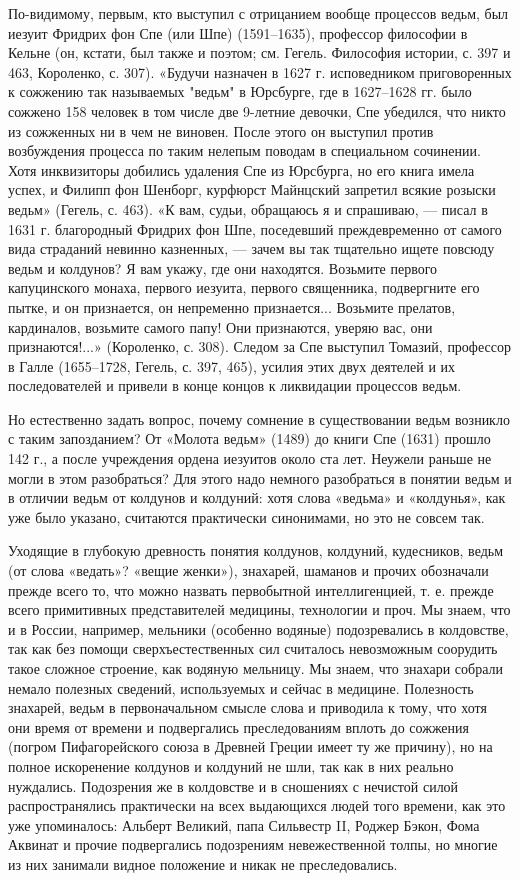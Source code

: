 По-видимому, первым, кто выступил с отрицанием вообще процессов ведьм, был
иезуит Фридрих фон Спе (или Шпе) (1591--1635), профессор философии в Кельне (он,
кстати, был также и поэтом; см. Гегель.
Философия истории, с. 397 и 463, Короленко, с. 307). «Будучи назначен в 1627 г.
исповедником приговоренных к сожжению так называемых "ведьм" в Юрсбурге, где в
1627--1628 гг. было сожжено 158 человек в том числе две 9-летние девочки, Спе
убедился, что никто из сожженных ни в чем не виновен. После этого он выступил
против возбуждения процесса по таким нелепым поводам в специальном сочинении.
Хотя инквизиторы добились удаления Спе из Юрсбурга, но его книга имела успех, и
Филипп фон Шенборг, курфюрст Майнцский запретил всякие розыски ведьм» (Гегель,
с. 463). «К вам, судьи, обращаюсь я и спрашиваю, --- писал в 1631 г. благородный
Фридрих фон Шпе, поседевший преждевременно от самого вида страданий невинно
казненных, --- зачем вы так тщательно ищете повсюду ведьм и колдунов? Я вам
укажу, где они находятся. Возьмите первого капуцинского монаха, первого
иезуита, первого священника, подвергните его пытке, и он признается, он
непременно признается... Возьмите прелатов, кардиналов, возьмите самого папу!
Они признаются, уверяю вас, они признаются!...» (Короленко, с. 308). Следом за
Спе выступил Томазий, профессор в Галле (1655--1728, Гегель, с. 397, 465),
усилия этих двух деятелей и их последователей и привели в конце концов к
ликвидации процессов ведьм.

Но естественно задать вопрос, почему сомнение в существовании ведьм возникло с
таким запозданием? От «Молота ведьм» (1489) до книги Спе (1631) прошло 142 г.,
а после учреждения ордена иезуитов около ста лет. Неужели раньше не могли в
этом разобраться? Для этого надо немного разобраться в понятии ведьм и в
отличии ведьм от колдунов и колдуний: хотя слова «ведьма» и «колдунья», как уже
было указано, считаются практически синонимами, но это не совсем так.

Уходящие в глубокую древность понятия колдунов, колдуний, кудесников, ведьм (от
слова «ведать»? «вещие женки»), знахарей, шаманов и прочих обозначали прежде
всего то, что можно назвать первобытной интеллигенцией, т. е. прежде всего
примитивных представителей медицины, технологии и проч. Мы знаем, что и в
России, например, мельники (особенно водяные) подозревались в колдовстве, так
как без помощи сверхъестественных сил считалось невозможным соорудить такое
сложное строение, как водяную мельницу. Мы знаем, что знахари собрали немало
полезных сведений, используемых и сейчас в медицине. Полезность знахарей, ведьм
в первоначальном смысле слова и приводила к тому, что хотя они время от времени
и подвергались преследованиям вплоть до сожжения (погром Пифагорейского союза в
Древней Греции имеет ту же причину), но на полное искоренение колдунов и
колдуний не шли, так как в них реально нуждались. Подозрения же в колдовстве и
в сношениях с нечистой силой распространялись практически на всех выдающихся
людей того времени, как это уже упоминалось: Альберт Великий, папа Сильвестр
II, Роджер Бэкон, Фома Аквинат и прочие подвергались подозрениям невежественной
толпы, но многие из них занимали видное положение и никак не преследовались.

